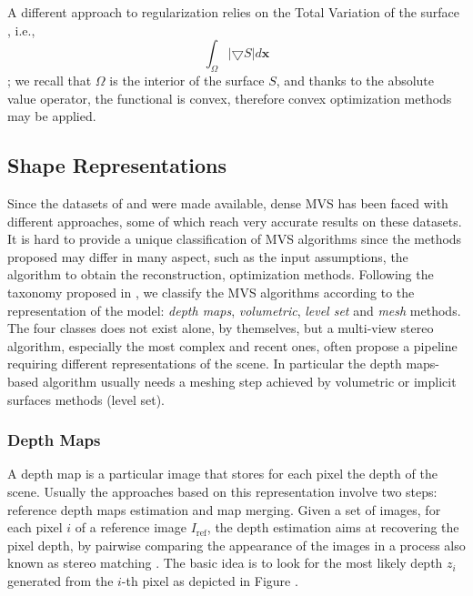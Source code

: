 
A different approach to regularization relies on the Total Variation of the surface \cite{chambolle2010introduction}, i.e., 
\[
\int_{\mathit{\Omega}}|\bigtriangledown \mathit{S}|d\mathbf{x}
\];
we recall that  $\mathit{\Omega}$ is the interior of the surface $\mathit{S}$, and thanks to the absolute value operator, the functional is convex, therefore convex optimization methods may be applied.



\subsection{Shape Representations}
Since the datasets of \cite{Seitz_et_al06} and \cite{strecha2008} were made available, dense MVS has been faced with different approaches, some of which reach very accurate results on these datasets.
It is hard to provide a unique classification of MVS algorithms since the methods proposed may differ in many aspect, such as the input assumptions, the algorithm to obtain the reconstruction, optimization methods. Following the taxonomy proposed in \cite{Seitz_et_al06}, we classify the MVS algorithms according to the representation of the model: \emph{depth maps}, \emph{volumetric},  \emph{level set} and \emph{mesh} methods. The four classes does not exist alone, by themselves, but a multi-view stereo algorithm, especially the most complex and recent ones, often propose a pipeline requiring different representations of the scene. In particular the depth maps-based algorithm usually needs a meshing step achieved by volumetric or implicit surfaces methods (level set).

\subsubsection{Depth Maps}
A depth map is a particular image that stores for each pixel the depth of the scene.
Usually the approaches based on this representation involve two steps: reference depth maps estimation and map merging.
Given a set of images, for each pixel $i$ of a reference image $I_{\text{ref}}$, the depth estimation aims at recovering the pixel depth, by pairwise comparing the appearance of the images in a process also known as stereo matching \cite{scharstein2002taxonomy}. 
The basic idea is to look for the most likely depth $z_i$ generated from the $i$-th pixel as depicted in Figure .

